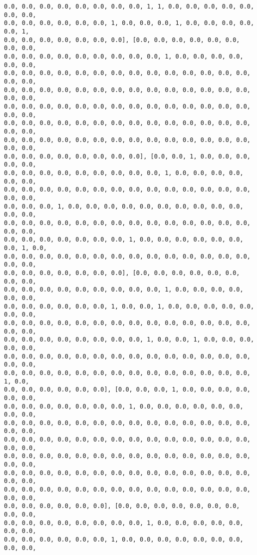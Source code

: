 \documentclass[11pt]{article}
\begin{document}
\begin{Verbatim}[commandchars=\\\{\}]
0.0, 0.0, 0.0, 0.0, 0.0, 0.0, 0.0, 0.0, 1, 1, 0.0, 0.0, 0.0, 0.0, 0.0, 0.0, 0.0,
0.0, 0.0, 0.0, 0.0, 0.0, 0.0, 1, 0.0, 0.0, 0.0, 1, 0.0, 0.0, 0.0, 0.0, 0.0, 1,
0.0, 0.0, 0.0, 0.0, 0.0, 0.0, 0.0], [0.0, 0.0, 0.0, 0.0, 0.0, 0.0, 0.0, 0.0,
0.0, 0.0, 0.0, 0.0, 0.0, 0.0, 0.0, 0.0, 0.0, 1, 0.0, 0.0, 0.0, 0.0, 0.0, 0.0,
0.0, 0.0, 0.0, 0.0, 0.0, 0.0, 0.0, 0.0, 0.0, 0.0, 0.0, 0.0, 0.0, 0.0, 0.0, 0.0,
0.0, 0.0, 0.0, 0.0, 0.0, 0.0, 0.0, 0.0, 0.0, 0.0, 0.0, 0.0, 0.0, 0.0, 0.0, 0.0,
0.0, 0.0, 0.0, 0.0, 0.0, 0.0, 0.0, 0.0, 0.0, 0.0, 0.0, 0.0, 0.0, 0.0, 0.0, 0.0,
0.0, 0.0, 0.0, 0.0, 0.0, 0.0, 0.0, 0.0, 0.0, 0.0, 0.0, 0.0, 0.0, 0.0, 0.0, 0.0,
0.0, 0.0, 0.0, 0.0, 0.0, 0.0, 0.0, 0.0, 0.0, 0.0, 0.0, 0.0, 0.0, 0.0, 0.0, 0.0,
0.0, 0.0, 0.0, 0.0, 0.0, 0.0, 0.0, 0.0], [0.0, 0.0, 1, 0.0, 0.0, 0.0, 0.0, 0.0,
0.0, 0.0, 0.0, 0.0, 0.0, 0.0, 0.0, 0.0, 0.0, 1, 0.0, 0.0, 0.0, 0.0, 0.0, 0.0,
0.0, 0.0, 0.0, 0.0, 0.0, 0.0, 0.0, 0.0, 0.0, 0.0, 0.0, 0.0, 0.0, 0.0, 0.0, 0.0,
0.0, 0.0, 0.0, 1, 0.0, 0.0, 0.0, 0.0, 0.0, 0.0, 0.0, 0.0, 0.0, 0.0, 0.0, 0.0,
0.0, 0.0, 0.0, 0.0, 0.0, 0.0, 0.0, 0.0, 0.0, 0.0, 0.0, 0.0, 0.0, 0.0, 0.0, 0.0,
0.0, 0.0, 0.0, 0.0, 0.0, 0.0, 0.0, 1, 0.0, 0.0, 0.0, 0.0, 0.0, 0.0, 0.0, 1, 0.0,
0.0, 0.0, 0.0, 0.0, 0.0, 0.0, 0.0, 0.0, 0.0, 0.0, 0.0, 0.0, 0.0, 0.0, 0.0, 0.0,
0.0, 0.0, 0.0, 0.0, 0.0, 0.0, 0.0], [0.0, 0.0, 0.0, 0.0, 0.0, 0.0, 0.0, 0.0,
0.0, 0.0, 0.0, 0.0, 0.0, 0.0, 0.0, 0.0, 0.0, 1, 0.0, 0.0, 0.0, 0.0, 0.0, 0.0,
0.0, 0.0, 0.0, 0.0, 0.0, 0.0, 1, 0.0, 0.0, 1, 0.0, 0.0, 0.0, 0.0, 0.0, 0.0, 0.0,
0.0, 0.0, 0.0, 0.0, 0.0, 0.0, 0.0, 0.0, 0.0, 0.0, 0.0, 0.0, 0.0, 0.0, 0.0, 0.0,
0.0, 0.0, 0.0, 0.0, 0.0, 0.0, 0.0, 0.0, 1, 0.0, 0.0, 1, 0.0, 0.0, 0.0, 0.0, 0.0,
0.0, 0.0, 0.0, 0.0, 0.0, 0.0, 0.0, 0.0, 0.0, 0.0, 0.0, 0.0, 0.0, 0.0, 0.0, 0.0,
0.0, 0.0, 0.0, 0.0, 0.0, 0.0, 0.0, 0.0, 0.0, 0.0, 0.0, 0.0, 0.0, 0.0, 1, 0.0,
0.0, 0.0, 0.0, 0.0, 0.0, 0.0], [0.0, 0.0, 0.0, 1, 0.0, 0.0, 0.0, 0.0, 0.0, 0.0,
0.0, 0.0, 0.0, 0.0, 0.0, 0.0, 0.0, 1, 0.0, 0.0, 0.0, 0.0, 0.0, 0.0, 0.0, 0.0,
0.0, 0.0, 0.0, 0.0, 0.0, 0.0, 0.0, 0.0, 0.0, 0.0, 0.0, 0.0, 0.0, 0.0, 0.0, 0.0,
0.0, 0.0, 0.0, 0.0, 0.0, 0.0, 0.0, 0.0, 0.0, 0.0, 0.0, 0.0, 0.0, 0.0, 0.0, 0.0,
0.0, 0.0, 0.0, 0.0, 0.0, 0.0, 0.0, 0.0, 0.0, 0.0, 0.0, 0.0, 0.0, 0.0, 0.0, 0.0,
0.0, 0.0, 0.0, 0.0, 0.0, 0.0, 0.0, 0.0, 0.0, 0.0, 0.0, 0.0, 0.0, 0.0, 0.0, 0.0,
0.0, 0.0, 0.0, 0.0, 0.0, 0.0, 0.0, 0.0, 0.0, 0.0, 0.0, 0.0, 0.0, 0.0, 0.0, 0.0,
0.0, 0.0, 0.0, 0.0, 0.0, 0.0], [0.0, 0.0, 0.0, 0.0, 0.0, 0.0, 0.0, 0.0, 0.0,
0.0, 0.0, 0.0, 0.0, 0.0, 0.0, 0.0, 0.0, 1, 0.0, 0.0, 0.0, 0.0, 0.0, 0.0, 0.0,
0.0, 0.0, 0.0, 0.0, 0.0, 0.0, 1, 0.0, 0.0, 0.0, 0.0, 0.0, 0.0, 0.0, 0.0, 0.0,

\end{Verbatim}
\end{document}
